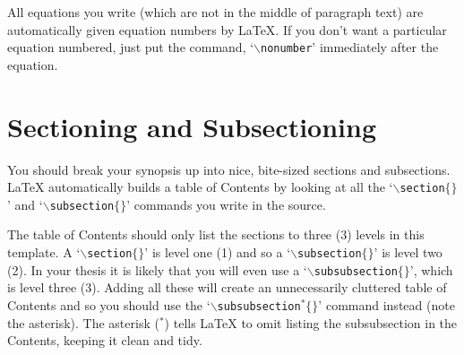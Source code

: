 All equations you write (which are not in the middle of paragraph text) are automatically given equation numbers by \LaTeX{}. If you don't want a particular equation numbered, just put the command, `$\backslash$\texttt{nonumber}' immediately after the equation.


\section{Sectioning and Subsectioning}

You should break your synopsis up into nice, bite-sized sections and subsections. \LaTeX{} automatically builds a table of Contents by looking at all the `$\backslash$\texttt{section}$\{\}$' and `$\backslash$\texttt{subsection}$\{\}$' commands you write in the source.

The table of Contents should only list the sections to three (3) levels in this template. A `$\backslash$\texttt{section}$\{\}$' is level one (1) and so a `$\backslash$\texttt{subsection}$\{\}$' is level two (2). In your thesis it is likely that you will even use a `$\backslash$\texttt{subsubsection}$\{\}$', which is level three (3). Adding all these will create an unnecessarily cluttered table of Contents and so you should use the `$\backslash$\texttt{subsubsection$^{*}\{\}$}' command instead (note the asterisk). The asterisk ($^{*}$) tells \LaTeX{} to omit listing the subsubsection in the Contents, keeping it clean and tidy.

